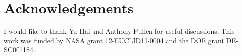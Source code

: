 \documentclass[fleqn,usenatbib]{mnras}
\begin{document}
\section*{Acknowledgements}
I would like to thank Yu Hai and Anthony Pullen for useful discussions. This
work was funded by NASA grant 12-EUCLID11-0004 and the DOE grant DE-SC001184.




%



\end{document}
